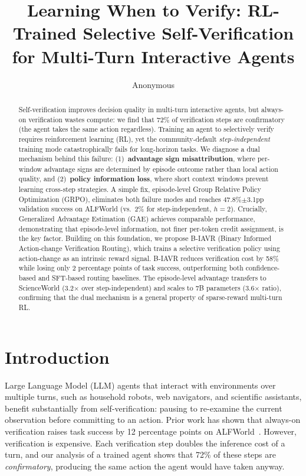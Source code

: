 \documentclass[10pt]{article}
\title{Learning When to Verify: RL-Trained Selective Self-Verification \\ for Multi-Turn Interactive Agents}
\author{Anonymous}
\date{}
\newcommand{\ours}{B-IAVR}
\begin{document}
\maketitle

\begin{abstract}
Self-verification improves decision quality in multi-turn interactive agents, but always-on verification wastes compute: we find that 72\% of verification steps are confirmatory (the agent takes the same action regardless). Training an agent to selectively verify requires reinforcement learning (RL), yet the community-default \emph{step-independent} training mode catastrophically fails for long-horizon tasks. We diagnose a dual mechanism behind this failure: (1)~\textbf{advantage sign misattribution}, where per-window advantage signs are determined by episode outcome rather than local action quality, and (2)~\textbf{policy information loss}, where short context windows prevent learning cross-step strategies. A simple fix, episode-level Group Relative Policy Optimization (GRPO), eliminates both failure modes and reaches 47.8\%$\pm$3.1pp validation success on ALFWorld (vs.\ 2\% for step-independent, $h{=}2$). Crucially, Generalized Advantage Estimation (GAE) achieves comparable performance, demonstrating that episode-level information, not finer per-token credit assignment, is the key factor. Building on this foundation, we propose \ours{} (Binary Informed Action-change Verification Routing), which trains a selective verification policy using action-change as an intrinsic reward signal. \ours{} reduces verification cost by 58\% while losing only 2 percentage points of task success, outperforming both confidence-based and SFT-based routing baselines. The episode-level advantage transfers to ScienceWorld (3.2$\times$ over step-independent) and scales to 7B parameters (3.6$\times$ ratio), confirming that the dual mechanism is a general property of sparse-reward multi-turn RL.
\end{abstract}

\section{Introduction}

Large Language Model (LLM) agents that interact with environments over multiple turns, such as household robots, web navigators, and scientific assistants, benefit substantially from self-verification: pausing to re-examine the current observation before committing to an action. Prior work has shown that always-on verification raises task success by 12 percentage points on ALFWorld~\citep{alfworld}. However, verification is expensive. Each verification step doubles the inference cost of a turn, and our analysis of a trained agent shows that 72\% of these steps are \emph{confirmatory}, producing the same action the agent would have taken anyway.
\end{document}
